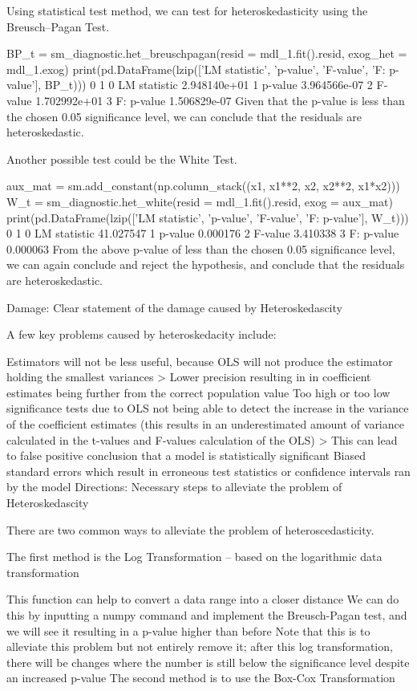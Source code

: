 Using statistical test method, we can test for heteroskedasticity using the Breusch–Pagan Test.

BP_t = sm_diagnostic.het_breuschpagan(resid = mdl_1.fit().resid, exog_het = mdl_1.exog)
print(pd.DataFrame(lzip(['LM statistic', 'p-value',  'F-value', 'F: p-value'], BP_t)))
              0             1
0  LM statistic  2.948140e+01
1       p-value  3.964566e-07
2       F-value  1.702992e+01
3    F: p-value  1.506829e-07
Given that the p-value is less than the chosen 0.05 significance level, we can conclude that the residuals are heteroskedastic.

Another possible test could be the White Test.

aux_mat = sm.add_constant(np.column_stack((x1, x1**2, x2, x2**2, x1*x2)))
W_t = sm_diagnostic.het_white(resid = mdl_1.fit().resid, exog = aux_mat)
print(pd.DataFrame(lzip(['LM statistic', 'p-value',  'F-value', 'F: p-value'], W_t)))
              0          1
0  LM statistic  41.027547
1       p-value   0.000176
2       F-value   3.410338
3    F: p-value   0.000063
From the above p-value of less than the chosen 0.05 significance level, we can again conclude and reject the hypothesis, and conclude that the residuals are heteroskedastic.

Damage: Clear statement of the damage caused by Heteroskedascity

A few key problems caused by heteroskedacity include:

Estimators will not be less useful, because OLS will not produce the estimator holding the smallest variances > Lower precision resulting in in coefficient estimates being further from the correct population value
Too high or too low significance tests due to OLS not being able to detect the increase in the variance of the coefficient estimates (this results in an underestimated amount of variance calculated in the t-values and F-values calculation of the OLS) > This can lead to false positive conclusion that a model is statistically significant
Biased standard errors which result in erroneous test statistics or confidence intervals ran by the model
Directions: Necessary steps to alleviate the problem of Heteroskedascity

There are two common ways to alleviate the problem of heteroscedasticity.

The first method is the Log Transformation – based on the logarithmic data transformation

This function can help to convert a data range into a closer distance
We can do this by inputting a numpy command and implement the Breusch-Pagan test, and we will see it resulting in a p-value higher than before
Note that this is to alleviate this problem but not entirely remove it; after this log transformation, there will be changes where the number is still below the significance level despite an increased p-value
The second method is to use the Box-Cox Transformation


